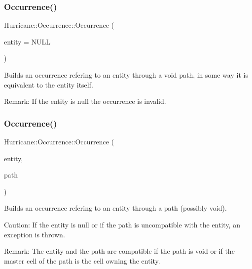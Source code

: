 \subsubsection{\texorpdfstring{Occurrence()}{Occurrence()}\hspace{0.1cm}{\footnotesize\ttfamily [1/3]}}
{\footnotesize\ttfamily Hurricane\+::\+Occurrence\+::\+Occurrence (\begin{DoxyParamCaption}\item[{const \mbox{\hyperlink{classHurricane_1_1Entity}{Entity}} $\ast$}]{entity = {\ttfamily NULL} }\end{DoxyParamCaption})}

Builds an occurrence refering to an entity through a void path, in some way it is equivalent to the entity itself.

\begin{DoxyParagraph}{Remark\+: If the entity is null the occurrence is invalid. }

\end{DoxyParagraph}
\mbox{\label{classHurricane_1_1Occurrence_afedb5d75781a9a4f0a19d37f0e8c88a8}} 
\subsubsection{\texorpdfstring{Occurrence()}{Occurrence()}\hspace{0.1cm}{\footnotesize\ttfamily [2/3]}}
{\footnotesize\ttfamily Hurricane\+::\+Occurrence\+::\+Occurrence (\begin{DoxyParamCaption}\item[{const \mbox{\hyperlink{classHurricane_1_1Entity}{Entity}} $\ast$}]{entity,  }\item[{const \mbox{\hyperlink{classHurricane_1_1Path}{Path}} \&}]{path }\end{DoxyParamCaption})}

Builds an occurrence refering to an entity through a path (possibly void).

\begin{DoxyParagraph}{Caution\+: If the entity is null or if the path is uncompatible with the }
entity, an exception is thrown.
\end{DoxyParagraph}
\begin{DoxyParagraph}{Remark\+: The entity and the path are compatible if the path is void or }
if the master cell of the path is the cell owning the entity. 
\end{DoxyParagraph}
\mbox{\label{classHurricane_1_1Occurrence_affec5f25b9c2efa2bcde02e9c4833626}} 

